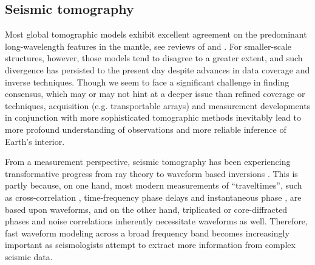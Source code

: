 \documentclass[extra,referee]{gji}
\begin{document}
\subsection{Seismic tomography}
\label{sec:tomography}
Most global tomographic models exhibit excellent agreement on the 
predominant long-wavelength features in the mantle,
see reviews of \cite{becker2002comparison} and \cite{auer2014savani}. 
For smaller-scale structures, however, those models tend to disagree to a 
greater extent, and such divergence has persisted to the present day
despite advances in data coverage and inverse techniques. 
Though we seem to face a significant challenge in finding consensus, which 
may or may not hint at a deeper issue than refined coverage or techniques,
acquisition (e.g. transportable arrays) and measurement developments 
in conjunction with more sophisticated tomographic methods
inevitably lead to more profound understanding of observations
and more reliable inference of Earth's interior.

From a measurement perspective, 
seismic tomography has been experiencing transformative progress
from ray theory \cite[]{rawlinson2010seismic} to waveform based
inversions \cite[]{tape2009adjoint, fichtner2008theoretical}. 
This is partly because, on one hand,
most modern measurements of ``traveltimes'', 
such as cross-correlation \cite[Chap 7,][]{nolet2008breviary}, 
time-frequency phase delays \cite[]{fichtner2008theoretical, 
kristekova2009time} and instantaneous phase \cite[]{bozdaug2011misfit}, 
are based upon waveforms,
and on the other hand, triplicated \cite[]{stahler2012triplicated} or 
core-diffracted phases \cite[]{bharadwaj2013enhancing, hosseini2015multifrequency} 
and noise correlations \cite[]{basini2013influence} inherently 
necessitate waveforms as well.
Therefore, fast waveform modeling across a broad frequency band
becomes increasingly important as seismologists attempt to extract  
more information from complex seismic data. 
\end{document}
